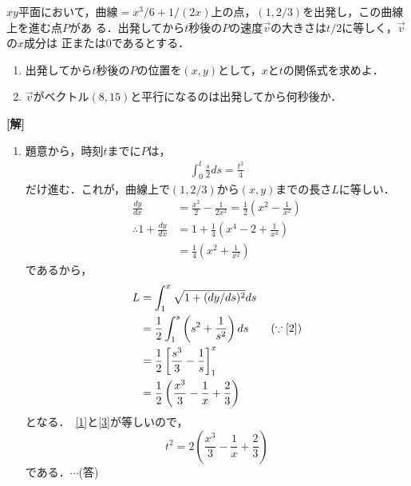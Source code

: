 \documentclass[a4j]{jarticle}
\begin{document}

     \begin{oframed}
     $xy$平面において，曲線$=x^3/6+1/(2x)$上の点，$(1,2/3)$を出発し，この曲線上を進む点$P$があ
     る．出発してから$t$秒後の$P$の速度$\vec{v}$の大きさは$t/2$に等しく，$\vec{v}$の$x$成分は
     正または$0$であるとする．
          \begin{enumerate}[(1)]
          \item 出発してから$t$秒後の$P$の位置を$(x,y)$として，$x$と$t$の関係式を求めよ．
          \item $\vec{v}$がベクトル$(8,15)$と平行になるのは出発してから何秒後か．
          \end{enumerate}
     \end{oframed}

\setlength{\columnseprule}{0.4pt}
\begin{multicols}{2}
{\bf[解]}
     \begin{enumerate}[(1)]
     \item 題意から，時刻$t$までに$P$は，
          \begin{align}
          \int_0^t\frac{s}{2}ds=\frac{t^2}{4}\label{1}
          \end{align} 
     だけ進む．これが，曲線上で$(1,2/3)$から$(x,y)$までの長さ$L$に等しい．
          \begin{align}
          \frac{dy}{dx}&=\frac{x^2}{2}-\frac{1}{2x^2}=\frac{1}{2}\left(x^2-\frac{1}{x^2}\right) \label{1} \\
          \therefore 1+\frac{dy}{dx}&=1+\frac{1}{4}\left(x^4-2+\frac{1}{x^4}\right) \nonumber\\
          &=\frac{1}{4}\left(x^2+\frac{1}{x^2}\right)\label{2}
          \end{align}
     であるから，
          \begin{align}
          L&=\int_1^x\sqrt{1+(dy/ds)^2}ds \nonumber\\
          &=\frac{1}{2}\int_1^s\left(s^2+\frac{1}{s^2}\right)ds\tag{$\because\eqref{2}$}\\
          &=\frac{1}{2}\left[\frac{s^3}{3}-\frac{1}{s}\right]_1^x \nonumber\\
          &=\frac{1}{2}\left(\frac{x^3}{3}-\frac{1}{x}+\frac{2}{3}\label{3}\right)
          \end{align}
     となる．　\eqref{1}と\eqref{3}が等しいので，
          \[t^2=2\left(\frac{x^3}{3}-\frac{1}{x}+\frac{2}{3}\right)\]
     である．$\cdots$(答)
     

\end{enumerate}
\end{multicols}
\end{document}
